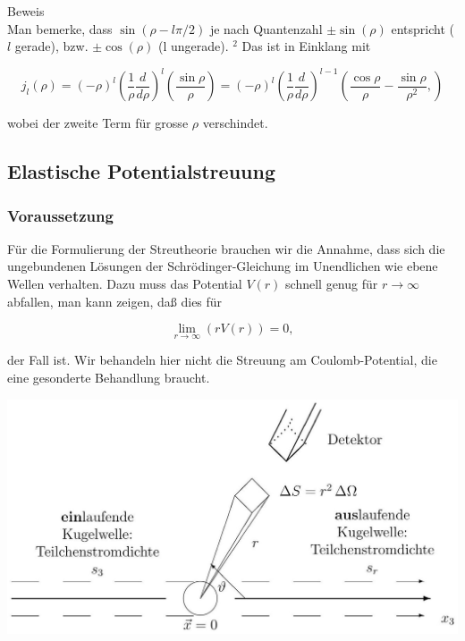 \documentclass[10pt, letterpaper]{article}
\begin{document}
Beweis\\
Man bemerke, dass $\sin (\rho-l \pi / 2)$ je nach Quantenzahl $\pm \sin (\rho)$ entspricht ( $l$ gerade), bzw. $\pm \cos (\rho)$ (l ungerade). ${ }^{2}$ Das ist in Einklang mit

$$
j_{l}(\rho)=(-\rho)^{l}\left(\frac{1}{\rho} \frac{d}{d \rho}\right)^{l}\left(\frac{\sin \rho}{\rho}\right)=(-\rho)^{l}\left(\frac{1}{\rho} \frac{d}{d \rho}\right)^{l-1}\left(\frac{\cos \rho}{\rho}-\frac{\sin \rho}{\rho^{2}},\right)
$$

wobei der zweite Term für grosse $\rho$ verschindet.

\subsection*{Elastische Potentialstreuung}
\subsubsection*{Voraussetzung}
Für die Formulierung der Streutheorie brauchen wir die Annahme, dass sich die ungebundenen Lösungen der Schrödinger-Gleichung im Unendlichen wie ebene Wellen verhalten. Dazu muss das Potential $V(r)$ schnell genug für $r \rightarrow \infty$ abfallen, man kann zeigen, daß dies für

$$
\lim _{r \rightarrow \infty}(r V(r))=0,
$$

der Fall ist. Wir behandeln hier nicht die Streuung am Coulomb-Potential, die eine gesonderte Behandlung braucht.

\includegraphics[scale=0.2, center]{2025_05_21_d5590f158a899e385c7cg-13}
\end{document}
